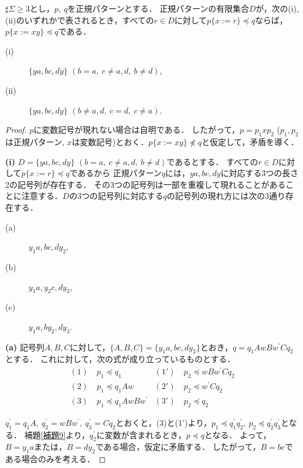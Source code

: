 \begin{lem}\label{片方}
$\sharp \Sigma \ge 3$とし，$p,~q$を正規パターンとする．
正規パターンの有限集合$D$が，次の{\rm (i), (ii)}のいずれかで表されるとき，すべての$r \in D$に対して$p \{ x := r \} \preceq q$ならば，$p \{ x := xy \} \preceq q$である．

\begin{description}
\item[{\rm (i)}] $\{ ya, bc, dy \}$ $(b = a,~c \not = a,d,~b \not = d)$,
\item[{\rm (ii)}] $\{ ya, bc, dy \}$ $(b \not = a,d,~c = d,~c \not = a)$.
\end{description}
\end{lem}
\begin{proof}
$p$に変数記号が現れない場合は自明である．
したがって，$p=p_{1}xp_{2}$ ($p_{1}, p_{2}$は正規パターン, $x$は変数記号)とおく．$p \{ x := xy \} \not \preceq q$と仮定して，矛盾を導く．

\noindent\textbf{(i)}
$D=\{ ya, bc, dy \}$ $(b = a,~c \not = a,d,~b \not = d)$であるとする．
すべての$r \in D$に対して$p \{ x := r \} \preceq q$であるから
正規パターン$q$には，$ya, bc, dy$に対応する3つの長さ2の記号列が存在する．
その3つの記号列は一部を重複して現れることがあることに注意する．$D$の3つの記号列に対応する$q$の記号列の現れ方には次の3通り存在する．

\begin{description}
\item[(a)] $y_{1}a, bc, dy_{2}$,
\item[(b)] $y_{1}a, y_{2}c, dy_{3}$,
\item[(c)] $y_{1}a, by_{2}, dy_{3}$.
\end{description}

\textbf{(a)}
記号列$A,B,C$に対して，$\{ A,B,C \} = \{ y_{1}a,bc,dy_{2} \}$とおき，$q=q_{1}AwBw^{\prime}Cq_{2}$とする．
これに対して，次の式が成り立っているものとする．
\begin{align*}
(1)~& p_{1} \preceq q_{1} & (1')~& p_{2} \preceq wBw^{\prime}Cq_{2} \\
(2)~& p_{1} \preceq q_{1}Aw & (2')~& p_{2} \preceq w^{\prime}Cq_{2} \\
(3)~& p_{1} \preceq q_{1}AwBw^{\prime} & (3')~& p_{2} \preceq q_{2}
\end{align*}

$q^{\prime}_{1}=q_{1}A,~q^{\prime}_{2}=wBw^{\prime},~q^{\prime}_{3}=Cq_{2}$とおくと，(3)と(1')より，$p_{1} \preceq q^{\prime}_{1}q^{\prime}_{2},~p_{2} \preceq q^{\prime}_{2}q^{\prime}_{3}$となる．
補題\ref{補題9}より，$q^{\prime}_{2}$に変数が含まれるとき，$p \preceq q$となる．
よって，$B=y_{1}a$または，$B=dy_{2}$である場合，仮定に矛盾する．
したがって，$B=bc$である場合のみを考える．


\end{proof}
